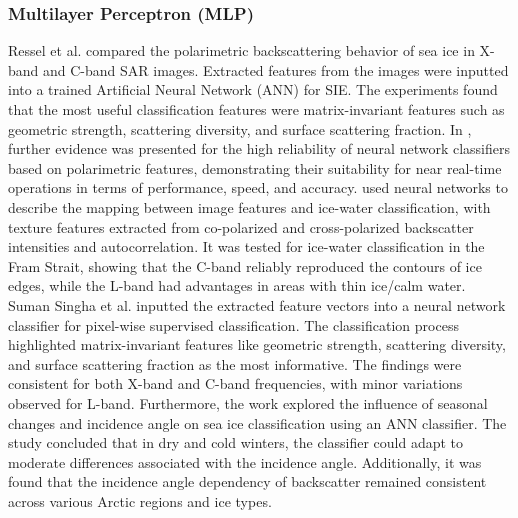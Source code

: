 \subsubsection{Multilayer Perceptron (MLP)}
Ressel et al. \cite{43ressel2016comparing,44ressel2016evaluating} compared the polarimetric backscattering behavior of sea ice in X-band and C-band SAR images. Extracted features from the images were inputted into a trained Artificial Neural Network (ANN) for SIE. The experiments found that the most useful classification features were matrix-invariant features such as geometric strength, scattering diversity, and surface scattering fraction. In \cite{45ressel2016investigation}, further evidence was presented for the high reliability of neural network classifiers based on polarimetric features, demonstrating their suitability for near real-time operations in terms of performance, speed, and accuracy. \cite{46aldenhoff2018comparison} used neural networks to describe the mapping between image features and ice-water classification, with texture features extracted from co-polarized and cross-polarized backscatter intensities and autocorrelation. It was tested for ice-water classification in the Fram Strait, showing that the C-band reliably reproduced the contours of ice edges, while the L-band had advantages in areas with thin ice/calm water. Suman Singha et al. \cite{47singha2018arctic} inputted the extracted feature vectors into a neural network classifier for pixel-wise supervised classification. The classification process highlighted matrix-invariant features like geometric strength, scattering diversity, and surface scattering fraction as the most informative. The findings were consistent for both X-band and C-band frequencies, with minor variations observed for L-band. Furthermore, the work \cite{48singha2020robustness} explored the influence of seasonal changes and incidence angle on sea ice classification using an ANN classifier. The study concluded that in dry and cold winters, the classifier could adapt to moderate differences associated with the incidence angle. Additionally, it was found that the incidence angle dependency of backscatter remained consistent across various Arctic regions and ice types.

